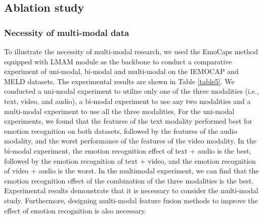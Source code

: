 {{\begin{table}[htbp]
	\renewcommand\arraystretch{1.2}
\end{table}

\subsection{Ablation study}
\subsubsection{Necessity of multi-modal data}
To illustrate the necessity of multi-modal research, we used the EmoCaps method equipped with LMAM module as the backbone to conduct a comparative experiment of {uni-modal, bi-modal and multi-modal} on the IEMOCAP and MELD datasets. The experimental results are shown in Table \ref{table5}. We conducted a {uni-modal} experiment to utilize only one of the three modalities (i.e., text, video, and audio), {a bi-modal experiment to use any two modalities} and a multi-modal experiment to use all the three modalities. For the {uni-modal} experiments, we found that the features of the text modality performed best for emotion recognition on both datasets, followed by the features of the audio modality, and the worst performance of the features of the video modality. {In the bi-modal experiment, the emotion recognition effect of text + audio is the best, followed by the emotion recognition of text + video, and the emotion recognition of video + audio is the worst.} In the multimodal experiment, we can find that the emotion recognition effect of the combination of the three modalities is the best. Experimental results demonstrate that it is necessary to consider the multi-modal study. Furthermore, designing multi-modal feature fusion methods to improve the effect of emotion recognition is also necessary.

}}
